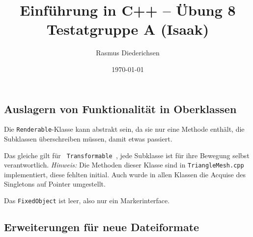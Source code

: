 \documentclass{article}
\title{Einführung in C++ -- Übung 8 \\ Testatgruppe A (Isaak)}
\author{Rasmus Diederichsen}
\date{\today}
\begin{document}
   \maketitle

   \setcounter{section}{8}

   \subsection{Auslagern von Funktionalität in Oberklassen}
   
   Die \texttt{Renderable}-Klasse kann abstrakt sein, da sie nur eine Methode
   enthält, die Subklassen überschreiben müssen, damit etwas passiert.
   

   Das gleiche gilt für \texttt{ Transformable }, jede Subklasse ist für ihre
   Bewegung selbst verantwortlich. 
   \emph{Hinweis:} Die Methoden dieser Klasse sind in
   \texttt{TriangleMesh.cpp} implementiert, diese fehlten initial. Auch wurde in
   allen Klassen die Acquise des Singletons auf Pointer umgestellt.

   

   Das \texttt{FixedObject} ist leer, also nur ein Markerinterface.

   

   \subsection{Erweiterungen für neue Dateiformate}
   
   
   
   
   
   
   
\end{document}
